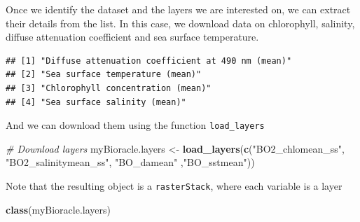\documentclass[
]{book}
\newenvironment{Shaded}{\begin{snugshade}}{\end{snugshade}}
\newcommand{\CommentTok}[1]{\textcolor[rgb]{0.56,0.35,0.01}{\textit{#1}}}
\newcommand{\FunctionTok}[1]{\textcolor[rgb]{0.13,0.29,0.53}{\textbf{#1}}}
\newcommand{\NormalTok}[1]{#1}
\newcommand{\OtherTok}[1]{\textcolor[rgb]{0.56,0.35,0.01}{#1}}
\newcommand{\SpecialCharTok}[1]{\textcolor[rgb]{0.81,0.36,0.00}{\textbf{#1}}}
\newcommand{\StringTok}[1]{\textcolor[rgb]{0.31,0.60,0.02}{#1}}
\begin{document}
Once we identify the dataset and the layers we are interested on, we can extract their details from the list. In this case, we download data on chlorophyll, salinity, diffuse attenuation coefficient and sea surface temperature.

\begin{Shaded}
\end{Shaded}

\begin{verbatim}
## [1] "Diffuse attenuation coefficient at 490 nm (mean)"
## [2] "Sea surface temperature (mean)"                  
## [3] "Chlorophyll concentration (mean)"                
## [4] "Sea surface salinity (mean)"
\end{verbatim}

And we can download them using the function \texttt{load\_layers}

\begin{Shaded}
\begin{Highlighting}[]
\CommentTok{\# Download layers}
\NormalTok{myBioracle.layers }\OtherTok{\textless{}{-}} \FunctionTok{load\_layers}\NormalTok{(}\FunctionTok{c}\NormalTok{(}\StringTok{"BO2\_chlomean\_ss"}\NormalTok{, }\StringTok{"BO2\_salinitymean\_ss"}\NormalTok{, }\StringTok{"BO\_damean"}\NormalTok{ ,}\StringTok{"BO\_sstmean"}\NormalTok{)) }
\end{Highlighting}
\end{Shaded}

Note that the resulting object is a \texttt{rasterStack}, where each variable is a layer

\begin{Shaded}
\begin{Highlighting}[]
\FunctionTok{class}\NormalTok{(myBioracle.layers)}
\end{Highlighting}
\end{Shaded}
\end{document}

